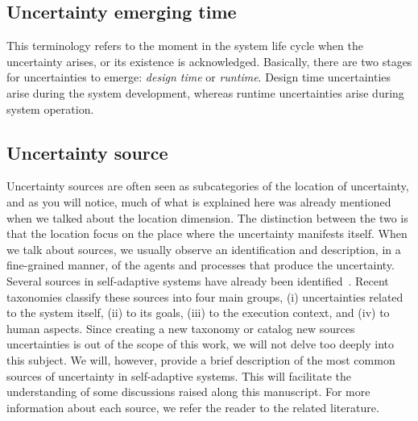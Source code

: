 \subsection{Uncertainty emerging time}

This terminology refers to the moment in the system life cycle when the uncertainty arises, or its existence is acknowledged. Basically, there are two stages for uncertainties to emerge: \textit{design time} or \textit{runtime}. Design time uncertainties arise during the system development, whereas runtime uncertainties arise during system operation.


\subsection{Uncertainty source}
Uncertainty sources are often seen as subcategories of the location of uncertainty, and as you will notice, much of what is explained here was already mentioned when we talked about the location dimension. The distinction between the two is that the location focus on the place where the uncertainty manifests itself. When we talk about sources, we usually observe an identification and description, in a fine-grained manner, of the agents and processes that produce the uncertainty. Several sources in self-adaptive systems have already been identified~\cite{ClassUncertainty,EsfahaniM10,taxonomy}. Recent taxonomies classify these sources into four main groups, (i) uncertainties related to the system itself, (ii) to its goals, (iii) to the execution context, and (iv) to human aspects. Since creating a new taxonomy or catalog new sources uncertainties is out of the scope of this work, we will not delve too deeply into this subject. We will, however, provide a brief description of the most common sources of uncertainty in self-adaptive systems. This will facilitate the understanding of some discussions raised along this manuscript. For more information about each source, we refer the reader to the related literature.

